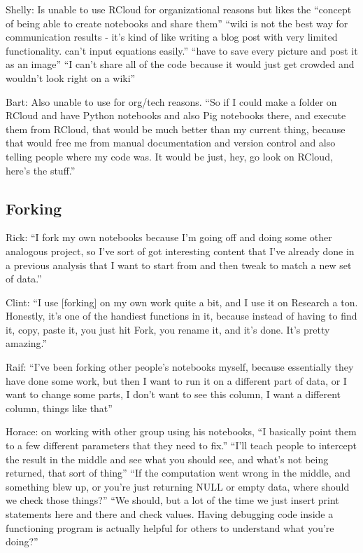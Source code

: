 Shelly: Is unable to use RCloud for organizational reasons but likes the ``concept of being able to create notebooks and share them'' ``wiki is not the best way for communication results - it's kind of like writing a blog post with very limited functionality. can't input equations easily.'' ``have to save every picture and post it as an image'' ``I can't share all of the code because it would just get crowded and wouldn't look right on a wiki''

Bart: Also unable to use for org/tech reasons. ``So if I could make a folder on RCloud and have Python notebooks and also Pig notebooks there, and execute them from RCloud, that would be much better than my current thing, because that would free me from manual documentation and version control and also telling people where my code was. It would be just, hey, go look on RCloud, here's the stuff.''


\subsection{Forking}
Rick: ``I fork my own notebooks because I'm going off and doing some other analogous project, so I've sort of got interesting content that I've already done in a previous analysis that I want to start from and then tweak to match a new set of data.''

Clint: ``I use [forking] on my own work quite a bit, and I use it on Research a ton. Honestly, it's one of the handiest functions in it, because instead of having to find it, copy, paste it, you just hit Fork, you rename it, and it's done. It's pretty amazing.''

Raif: ``I've been forking other people's notebooks myself, because essentially they have done some work, but then I want to run it on a different part of data, or I want to change some parts, I don't want to see this column, I want a different column, things like that''

Horace: on working with other group using his notebooks, ``I basically point them to a few different parameters that they need to fix.'' ``I'll teach people to intercept the result in the middle and see what you should see, and what's not being returned, that sort of thing'' ``If the computation went wrong in the middle, and something blew up, or you're just returning NULL or empty data, where should we check those things?'' ``We should, but a lot of the time we just insert print statements here and there and check values. Having debugging code inside a functioning program is actually helpful for others to understand what you're doing?''

